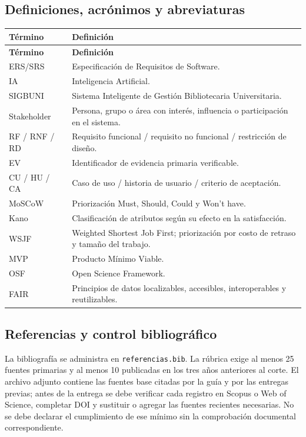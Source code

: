 \documentclass[12pt,journal,onecolumn]{IEEEtran}
\begin{document}
\subsection{Definiciones, acrónimos y abreviaturas}
\begin{longtable}{P{0.18\textwidth}P{0.76\textwidth}}\toprule
\textbf{Término} & \textbf{Definición}\\\midrule\endfirsthead
\toprule\textbf{Término} & \textbf{Definición}\\\midrule\endhead
ERS/SRS & Especificación de Requisitos de Software.\\
IA & Inteligencia Artificial.\\
SIGBUNI & Sistema Inteligente de Gestión Bibliotecaria Universitaria.\\
Stakeholder & Persona, grupo o área con interés, influencia o participación en el sistema.\\
RF / RNF / RD & Requisito funcional / requisito no funcional / restricción de diseño.\\
EV & Identificador de evidencia primaria verificable.\\
CU / HU / CA & Caso de uso / historia de usuario / criterio de aceptación.\\
MoSCoW & Priorización Must, Should, Could y Won't have.\\
Kano & Clasificación de atributos según su efecto en la satisfacción.\\
WSJF & Weighted Shortest Job First; priorización por costo de retraso y tamaño del trabajo.\\
MVP & Producto Mínimo Viable.\\
OSF & Open Science Framework.\\
FAIR & Principios de datos localizables, accesibles, interoperables y reutilizables.\\
\bottomrule
\end{longtable}

\subsection{Referencias y control bibliográfico}
La bibliografía se administra en \texttt{referencias.bib}. La rúbrica exige al menos 25 fuentes primarias y al menos 10 publicadas en los tres años anteriores al corte. El archivo adjunto contiene las fuentes base citadas por la guía y por las entregas previas; antes de la entrega se debe verificar cada registro en Scopus o Web of Science, completar DOI y sustituir o agregar las fuentes recientes necesarias. No se debe declarar el cumplimiento de ese mínimo sin la comprobación documental correspondiente.
\end{document}
